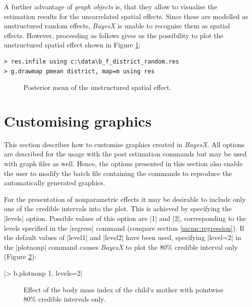 A further advantage of {\it graph objects} is, that they allow to visualise the estimation results for the uncorrelated spatial
effects. Since these are modelled as unstructured random effects, {\it BayesX} is unable to recognise them as spatial effects.
However, proceeding as follows gives us the possibility to plot the unstructured spatial effect shown in Figure
\ref{mcmc:random1}:

\begin{verbatim}
> res.infile using c:\data\b_f_district_random.res
> g.drawmap pmean district, map=m using res
\end{verbatim}

\begin{figure}[ht]
\begin{center}
{\it\caption{Posterior mean of the unstructured spatial
effect.\label{mcmc:random1}}}
\end{center}
\end{figure}

\section{Customising graphics}\label{mcmc:custom}

This section describes how to customise graphics created in {\it BayesX}. All options are described for the usage with the post
estimation commands but may be used with graph files as well. Hence, the options presented in this section also enable the user
to modify the batch file containing the commands to reproduce the automatically generated graphics.

For the presentation of nonparametric effects it may be desirable to include only one of the credible intervals into the plot.
This is achieved by specifying the |levels| option. Possible values of this option are |1| and |2|, corresponding to the levels
specified in the |regress| command (compare section \ref{mcmc:regression}). If the default values of |level1| and |level2| have
been used, specifying |level=2| in the |plotnonp| command causes {\it BayesX} to plot the 80\% credible interval only (Figure
\ref{mcmc:bmi3}):

|> b.plotnonp 1, levels=2|

\begin{figure}[ht]
\begin{center}
 {\it\caption{Effect of
the body mass index of the child`s mother with pointwise 80\%
credible intervals only.\label{mcmc:bmi3}}}
\end{center}
\end{figure}

